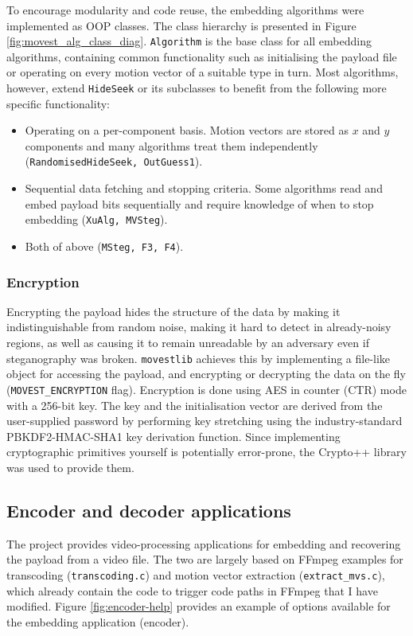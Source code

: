 \documentclass[12pt,british,twoside,notitlepage,usenames,dvipsnames,hypens,final]{report}
\numberwithin{equation}{section}
\numberwithin{figure}{section}
\begin{document}
To encourage modularity and code reuse, the embedding algorithms were implemented as OOP classes. The class hierarchy is presented in Figure \ref{fig:movest_alg_class_diag}. \texttt{Algorithm} is the base class for all embedding algorithms, containing common functionality such as initialising the payload file or operating on every motion vector of a suitable type in turn. Most algorithms, however, extend \texttt{HideSeek} or its subclasses to benefit from the following more specific functionality:

\begin{itemize}
\item Operating on a per-component basis. Motion vectors are stored as $x$ and $y$ components and many algorithms treat them independently (\texttt{RandomisedHideSeek, OutGuess1}).
\item Sequential data fetching and stopping criteria. Some algorithms read and embed payload bits sequentially and require knowledge of when to stop embedding (\texttt{XuAlg, MVSteg}).
\item Both of above (\texttt{MSteg, F3, F4}).
\end{itemize}

\subsubsection{Encryption}
\label{encryption}
Encrypting the payload hides the structure of the data by making it indistinguishable from random noise, making it hard to detect in already-noisy regions, as well as causing it to remain unreadable by an adversary even if steganography was broken. \texttt{movestlib} achieves this by implementing a file-like object for accessing the payload, and encrypting or decrypting the data on the fly (\texttt{MOVEST\_ENCRYPTION} flag). Encryption is done using AES in counter (CTR) mode with a 256-bit key. The key and the initialisation vector are derived from the user-supplied password by performing key stretching using the industry-standard PBKDF2-HMAC-SHA1 key derivation function. Since implementing cryptographic primitives yourself is potentially error-prone, the Crypto++ library was used to provide them. 

\subsection{Encoder and decoder applications}
\label{enc-dec-bin}
The project provides video-processing applications for embedding and recovering the payload from a video file. The two are largely based on FFmpeg examples for transcoding (\texttt{transcoding.c}) and motion vector extraction (\texttt{extract\_mvs.c}), which already contain the code to trigger code paths in FFmpeg that I have modified. Figure \ref{fig:encoder-help} provides an example of options available for the embedding application (encoder).
\end{document}
